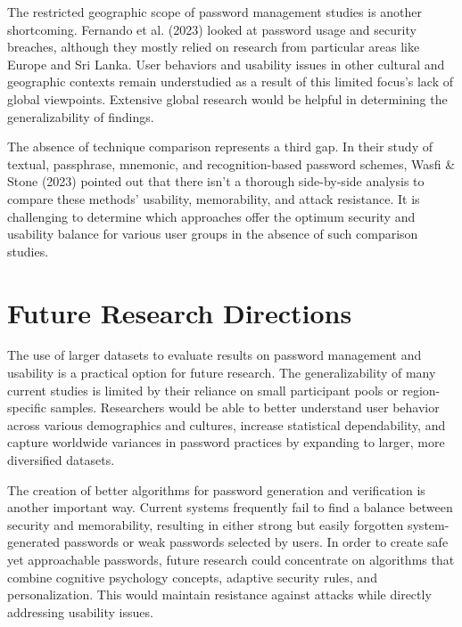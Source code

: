\documentclass[12pt,a4paper]{article}
\begin{document}
\vspace{0.4cm}

The restricted geographic scope of password management studies is another shortcoming. Fernando et al. (2023) looked at password usage and security breaches, although they mostly relied on research from particular areas like Europe and Sri Lanka. User behaviors and usability issues in other cultural and geographic contexts remain understudied as a result of this limited focus's lack of global viewpoints.
Extensive global research would be helpful in determining the generalizability of findings.

\vspace{0.4cm}

The absence of technique comparison represents a third gap. In their study of textual, passphrase, mnemonic, and recognition-based password schemes, Wasfi \& Stone (2023) pointed out that there isn't a thorough side-by-side analysis to compare these methods' usability, memorability, and attack resistance. It is challenging to determine which approaches offer the optimum security and usability balance for various user groups in the absence of such comparison studies.

\vspace{0.4cm}


\section{Future Research Directions}

The use of larger datasets to evaluate results on password management and usability is a practical option for future research. The generalizability of many current studies is limited by their reliance on small participant pools or region-specific samples. Researchers would be able to better understand user behavior across various demographics and cultures, increase statistical dependability, and capture worldwide variances in password practices by expanding to larger, more diversified datasets.

\vspace{0.4cm}

The creation of better algorithms for password generation and verification is another important way. Current systems frequently fail to find a balance between security and memorability, resulting in either strong but easily forgotten system-generated passwords or weak passwords selected by users. In order to create safe yet approachable passwords, future research could concentrate on algorithms that combine cognitive psychology concepts, adaptive security rules, and personalization. 
This would maintain resistance against attacks while directly addressing usability issues.
\end{document}
